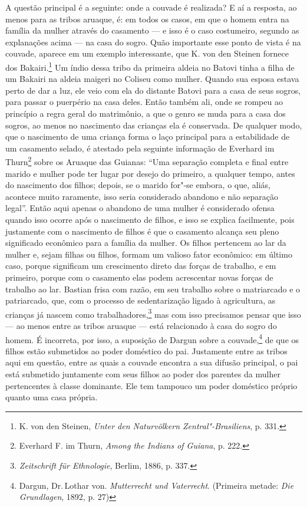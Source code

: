 A questão principal é a seguinte: onde a couvade é realizada? E aí a
resposta, ao menos para as tribos aruaque, é: em todos os casos, em que
o homem entra na família da mulher através do casamento --- e isso é o
caso costumeiro, segundo as explanações acima --- na casa do sogro. Quão
importante esse ponto de vista é na couvade, aparece em um exemplo
interessante, que K. von den Steinen fornece dos Bakairi.\footnote{K.
  von den Steinen, \emph{Unter den Naturvölkern Zentral"-Brasiliens}, p.
  331.} Um índio dessa tribo da primeira aldeia no Batovi tinha a filha
de um Bakairi na aldeia maigeri no Coliseu como mulher. Quando sua
esposa estava perto de dar a luz, ele veio com ela do distante Batovi
para a casa de seus sogros, para passar o puerpério na casa deles. Então
também ali, onde se rompeu ao princípio a regra geral do matrimônio, a
que o genro se muda para a casa dos sogros, ao menos no nascimento das
crianças ela é conservada. De qualquer modo, que o nascimento de uma
criança forma o laço principal para a estabilidade de um casamento
selado, é atestado pela seguinte informação de Everhard im
Thurn\footnote{Everhard F. im Thurn, \emph{Among the Indians of Guiana},
  p. 222.} sobre os Aruaque das Guianas: ``Uma separação completa e
final entre marido e mulher pode ter lugar por desejo do primeiro, a
qualquer tempo, antes do nascimento dos filhos; depois, se o marido
for"-se embora, o que, aliás, acontece muito raramente, isso seria
considerado abandono e não separação legal''. Então aqui apenas o
abandono de uma mulher é considerado ofensa quando isso ocorre após o
nascimento de filhos, e isso se explica facilmente, pois justamente com
o nascimento de filhos é que o casamento alcança seu pleno significado
econômico para a família da mulher. Os filhos pertencem ao lar da
mulher e, sejam filhas ou filhos, formam um valioso fator econômico: em
último caso, porque significam um crescimento direto das forças de
trabalho, e em primeiro, porque com o casamento elas podem acrescentar
novas forças de trabalho ao lar. Bastian frisa com razão, em seu
trabalho sobre o matriarcado e o patriarcado, que, com o processo de
sedentarização ligado à agricultura, as crianças já nascem como
trabalhadores,\footnote{\emph{Zeitschrift für Ethnologie}, Berlim, 1886,
  p. 337.} mas com isso precisamos pensar que isso --- ao menos entre as
tribos aruaque --- está relacionado à casa do sogro do homem. É
incorreta, por isso, a suposição de Dargun sobre a couvade,\footnote{Dargun,
  Dr.\,Lothar von. \emph{Mutterrecht und Vaterrecht}. (Primeira metade:
  \emph{Die Grundlagen}, 1892, p. 27)} de que os filhos estão
submetidos ao poder doméstico do pai. Justamente entre as tribos aqui em
questão, entre as quais a couvade encontra a sua difusão principal, o
pai está submetido juntamente com seus filhos ao poder dos parentes da
mulher pertencentes à classe dominante. Ele tem tampouco um poder
doméstico próprio quanto uma casa própria.

